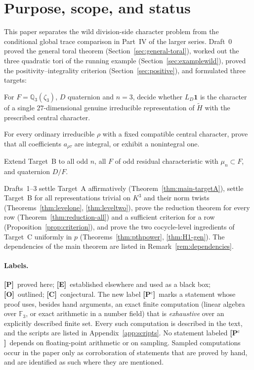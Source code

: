 \documentclass[11pt]{article}
\newcommand{\Q}{\mathbb Q}
\newcommand{\Fq}{\mathbb F}
\newcommand{\tH}{\widetilde H}
\newcommand{\Ptag}{\textnormal{\textbf{[P]}}}
\newcommand{\Pctag}{\textnormal{\textbf{[P$^{\mathrm c}$]}}}
\newcommand{\Etag}{\textnormal{\textbf{[E]}}}
\newcommand{\Otag}{\textnormal{\textbf{[O]}}}
\newcommand{\Ctag}{\textnormal{\textbf{[C]}}}
\theoremstyle{plain}
\theoremstyle{definition}
\begin{document}
\section{Purpose, scope, and status}\label{sec:intro}
This paper separates the wild division-side character problem from the
conditional global trace comparison in Part~IV of the larger series.
Draft~0 proved the general toral theorem (Section~\ref{sec:general-toral}),
worked out the three quadratic tori of the running example
(Section~\ref{sec:examplewild}), proved the positivity--integrality
criterion (Section~\ref{sec:positive}), and formulated three targets:
\begin{description}[style=nextline]
\item[Target A] For $F=\Q_3(\zeta_3)$, $D$ quaternion and $n=3$, decide
whether $L_D\mathbf1$ is the character of a single $27$-dimensional
genuine irreducible representation of $\tH$ with the prescribed central
character.
\item[Target B] For every ordinary irreducible $\rho$ with a fixed
compatible central character, prove that all coefficients $a_{\rho\tau}$
are integral, or exhibit a nonintegral one.
\item[Target C] Extend Target~B to all odd $n$, all $F$ of odd residual
characteristic with $\mu_n\subset F$, and quaternion $D/F$.
\end{description}
Drafts~1--3 settle Target~A affirmatively (Theorem~\ref{thm:main-targetA}),
settle Target~B for all representations trivial on $K^3$ and their norm
twists (Theorems~\ref{thm:levelone}, \ref{thm:leveltwo}), prove the reduction theorem for
every row (Theorem~\ref{thm:reduction-all}) and a sufficient criterion
for a row (Proposition~\ref{prop:criterion}), and prove the two
cocycle-level ingredients of Target~C uniformly in $p$
(Theorems~\ref{thm:pthpower}, \ref{thm:H1-gen}).  The dependencies of
the main theorem are listed in Remark~\ref{rem:dependencies}.

\paragraph{Labels.}
\Ptag\ proved here; \Etag\ established elsewhere and used as a black
box; \Otag\ outlined; \Ctag\ conjectural.  The new label \Pctag\ marks
a statement whose proof uses, besides hand arguments, an exact finite
computation (linear algebra over $\Fq_3$, or exact arithmetic in a
number field) that is \emph{exhaustive} over an explicitly described
finite set.  Every such computation is described in the text, and the
scripts are listed in Appendix~\ref{app:scripts}.  No statement
labeled \Pctag\ depends on floating-point arithmetic or on sampling.
Sampled computations occur in the paper only as corroboration of
statements that are proved by hand, and are identified as such where
they are mentioned.
\end{document}

